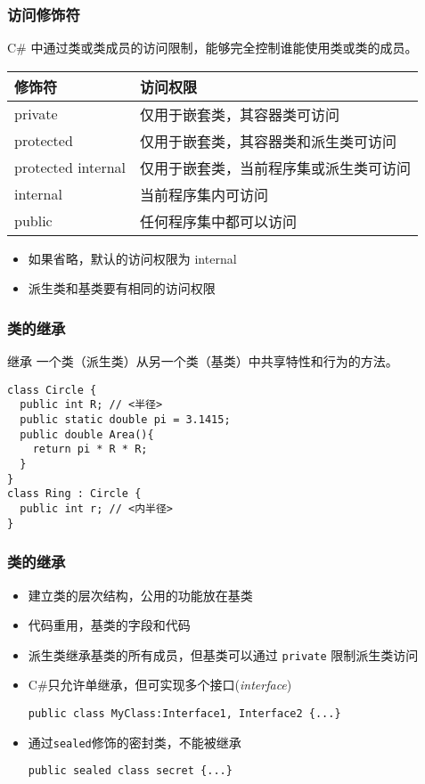 \begin{frame}
\frametitle{访问修饰符}

{\CJKindent C\# 中通过类或类成员的访问限制，能够完全控制谁能使用类或类的成员。}
\bigskip \pause

\begin{tabular}[tb]{l|l}
  \hline 修饰符      & 访问权限                               \\
  \hline
  private            & 仅用于嵌套类，其容器类可访问           \\
  protected          & 仅用于嵌套类，其容器类和派生类可访问   \\
  protected internal & 仅用于嵌套类，当前程序集或派生类可访问 \\
  internal           & 当前程序集内可访问                     \\
  public             & 任何程序集中都可以访问                 \\
  \hline
\end{tabular}
\bigskip \pause

\begin{itemize}
\item 如果省略，默认的访问权限为 internal
\item 派生类和基类要有相同的访问权限
\end{itemize}
\end{frame}

\begin{frame}[fragile]
\frametitle{类的继承}

  \begin{block}{继承}
    \CJKindent 一个类（派生类）从另一个类（基类）中共享特性和行为的方法。
  \end{block}
\pause

\begin{lstlisting}[escapeinside=<>]
class Circle {
  public int R; // <半径>
  public static double pi = 3.1415;
  public double Area(){
    return pi * R * R;
  }
}
class Ring : Circle {
  public int r; // <内半径>
}
\end{lstlisting}
\end{frame}

\begin{frame}[fragile]
\frametitle{类的继承}
  \begin{itemize}
    \setlength{\itemsep}{8pt plus 1pt}
  \item 建立类的层次结构，公用的功能放在基类\pause
  \item 代码重用，基类的字段和代码\pause
  \item 派生类继承基类的所有成员，但基类可以通过 \texttt{private} 限制派生类访问\pause
  \item C\#只允许单继承，但可实现多个接口(\textit{interface})\par
\lstinline|public class MyClass:Interface1, Interface2 {...}|\pause
  \item 通过\texttt{sealed}修饰的密封类，不能被继承\par
\lstinline|public sealed class secret {...}|
  \end{itemize}
\end{frame}

